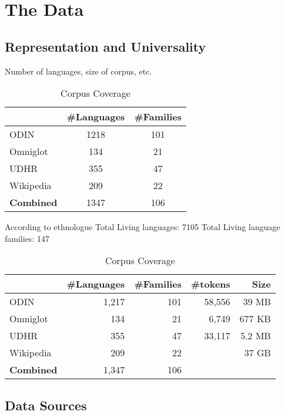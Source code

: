 \section{The Data}\label{sec:data}

\subsection{Representation and Universality} \label{sec:stats}

Number of languages, size of corpus, etc.

\begin{table}
\centering
    \begin{tabular}{l|cc}
    ~         				& \#Languages & \#Families \\ \hline
    ODIN      				& 1218       & 101       \\
    Omniglot  				& 134        & 21        \\
    UDHR      				& 355        & 47        \\
    Wikipedia 				& 209        & 22       \\ \hline
    \textbf{Combined}	& 1347			 & 106 
    \end{tabular}
\caption{Corpus Coverage}
\end{table}

According to ethnologue
Total Living languages: 7105
Total Living language families: 147


\begin{table}[h!]
\centering
    \begin{tabular}{l|rr|rr}
    ~         				& \#Languages & \#Families 	&\#tokens		& Size	\\ \hline
    ODIN      				& 1,217      & 101       		& 58,556		& 39 MB		\\
    Omniglot  				& 134        & 21        		&	6,749			& 677 KB	\\
    UDHR      				& 355        & 47        		&	33,117		& 5.2 MB	\\
    Wikipedia 				& 209        & 22       		&						& 37 GB		\\ \hline
    \textbf{Combined}	& 1,347			 & 106 
    \end{tabular}
\caption{Corpus Coverage}
\end{table}





\subsection{Data Sources} \label{sec:sources}


